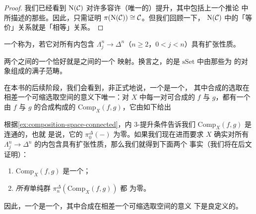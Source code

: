 \begin{proof}
我们已经看到 $\mathrm{N}(\mathcal{C})$ 对许多\trHorn{}容许（唯一的）提升，其中包括上一个推论
中所描述的那些。因此，只需证明 $\pi(\mathrm{N}(\mathcal{C})) \cong \mathcal{C}$。但我们回顾一下，
$\mathrm{N}(\mathcal{C})$ 中\trMorphism{}的「等价」关系就是「相等」关系。
\end{proof}

\begin{definition}\label{def:infinity-category}
一个\trSimplicialSet{}称为\emph{\trInfinityCategory{}}，若它对所有内\trHorn{}包含
$\Lambda^n_j \to \Delta^n$（$n \ge 2$，$0 < j < n$）具有扩张性质。
\end{definition}

\begin{definition}\label{def:functor-infinity-categories}
两个\trInfinityCategories{}之间的一个\trFunctor{}恰好就是\trSimplicialSet{}之间的一个
映射。换言之，\trInfinityCategories{}的\trCategory{}是 $\mathrm{sSet}$ 中由那些为%
\trInfinityCategories{}的对象组成的满子范畴。
\end{definition}

在本书的后续阶段，我们会看到，非正式地说，一个\trInfinityCategory{}是一个\trComposer{}，
其中合成的选取在相差一个可缩选取空间的意义下唯一：对\trComposer{} $X$ 中每一对可合成的%
\trMorphism{} $f$ 与 $g$，都有一个由 $f$ 与 $g$ 的合成构成的\trSimplicialSet{}%
$\mathrm{Comp}_X(f, g)$，它由如下\trPullback{}给出
\begin{center}
\end{center}
根据\cref{ex:composition-space-connected}，内 $3$-\trHorn{}提升条件告诉我们 $\mathrm{Comp}_X(f, g)$ 是连通的，也就
是说，它的 $\pi^{\Delta}_0(-)$ 为零。如果我们现在进而要求 $X$ 确实对所有
$\Lambda^n_j \to \Delta^n$ 的内\trHorn{}包含具有扩张性质，那么我们就得到下面两个
事实（我们将在后文证明）：
\begin{enumerate}[label=(\arabic*)]
  \item \trSimplicialSet{} $\mathrm{Comp}_X(f, g)$ 是一个\trKanComplex{}；
  \item \emph{所有}单纯\trHomotopy{}群 $\pi^{\Delta}_n(\mathrm{Comp}_X(f, g))$ 都
  为零。
\end{enumerate}
因此，一个\trInfinityCategory{}是一个\trComposer{}，其中合成在相差一个可缩选取空间的意义
下是良定义的。

